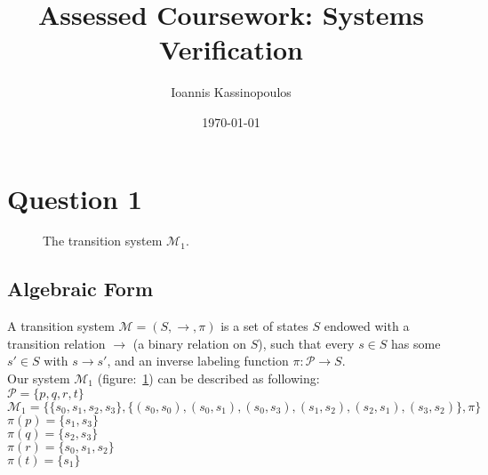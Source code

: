 \documentclass[a4paper]{article}
\begin{document}
\title{Assessed Coursework: Systems Verification}
\author{Ioannis Kassinopoulos}
\date{\today}
\maketitle
\section*{Question 1}
\begin{figure}[H]
  \centering
  \caption{The transition system $\mathcal{M}_1$.}
  \label{fig:m1}
\end{figure}

\subsection*{Algebraic Form}

A transition system $\mathcal{M}=(S,\rightarrow,\pi)$ is a set of states $S$ endowed with a transition relation 
$\rightarrow$ (a binary relation on $S$), such that every $s \in  S$ has some $s'\in S$ with $s\rightarrow s'$,
and an inverse labeling function $\pi:\mathcal{P}\rightarrow S$.
\\[0.5cm] 
Our system $\mathcal{M}_1$ (figure:~\ref{fig:m1}) can be described as following:
\\[0.cm] 
$\mathcal{P} = \{p,q,r,t\}$
\\[0.10cm] 
$\mathcal{M}_1 = \{\{ s_0,s_1,s_2,s_3 \} , \{ (s_0,s_0),(s_0,s_1),(s_0,s_3),(s_1,s_2),(s_2,s_1),(s_3,s_2)   \} , \pi \}$
\\[0.10cm] 
$\pi(p) = \{s_1,s_3 \}$
\\[0.10cm] 
$\pi(q) = \{s_2,s_3 \}$
\\[0.10cm] 
$\pi(r) = \{s_0,s_1,s_2 \}$
\\[0.10cm] 
$\pi(t) = \{ s_1 \}$
\end{document}
